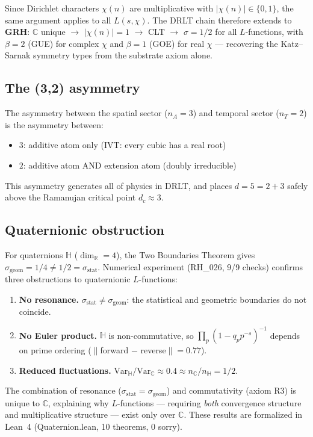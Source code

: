 \documentclass[12pt]{article}
\theoremstyle{definition}
\theoremstyle{remark}
\newcommand{\CC}{\mathbb{C}}
\newcommand{\RR}{\mathbb{R}}
\newcommand{\HH}{\mathbb{H}}
\begin{document}
Since Dirichlet characters $\chi(n)$ are multiplicative with
$|\chi(n)| \in \{0, 1\}$, the same argument applies to all
$L(s, \chi)$.
The DRLT chain therefore extends to \textbf{GRH}:
$\CC$ unique $\to$ $|\chi(n)| = 1$ $\to$ CLT $\to$
$\sigma = 1/2$ for all $L$-functions,
with $\beta = 2$ (GUE) for complex $\chi$ and
$\beta = 1$ (GOE) for real $\chi$ ---
recovering the Katz--Sarnak symmetry types from the
substrate axiom alone.

\subsection{The (3,2) asymmetry}

The asymmetry between the spatial sector ($n_A = 3$) and
temporal sector ($n_T = 2$) is the asymmetry between:
\begin{itemize}
\item $3$: additive atom only (IVT: every cubic has a real root)
\item $2$: additive atom AND extension atom (doubly irreducible)
\end{itemize}
This asymmetry generates all of physics in DRLT,
and places $d = 5 = 2 + 3$ safely above the Ramanujan
critical point $d_c \approx 3$.

\subsection{Quaternionic obstruction}

For quaternions $\HH$ ($\dim_\RR = 4$), the Two Boundaries
Theorem gives $\sigma_{\mathrm{geom}} = 1/4 \neq 1/2 =
\sigma_{\mathrm{stat}}$.
Numerical experiment (RH\_026, 9/9 checks) confirms three
obstructions to quaternionic $L$-functions:
\begin{enumerate}
\item \textbf{No resonance.} $\sigma_{\mathrm{stat}} \neq
  \sigma_{\mathrm{geom}}$: the statistical and geometric
  boundaries do not coincide.
\item \textbf{No Euler product.} $\HH$ is non-commutative,
  so $\prod_p (1 - q_p p^{-s})^{-1}$ depends on prime ordering
  ($\|$forward $-$ reverse$\| = 0.77$).
\item \textbf{Reduced fluctuations.}
  $\mathrm{Var}_\HH / \mathrm{Var}_\CC \approx 0.4 \approx
  n_\CC/n_\HH = 1/2$.
\end{enumerate}
The combination of resonance ($\sigma_{\mathrm{stat}} =
\sigma_{\mathrm{geom}}$) and commutativity (axiom R3) is
unique to $\CC$, explaining why $L$-functions --- requiring
\emph{both} convergence structure and multiplicative structure
--- exist only over $\CC$.
These results are formalized in Lean~4 (Quaternion.lean,
10 theorems, 0 sorry).
\end{document}
